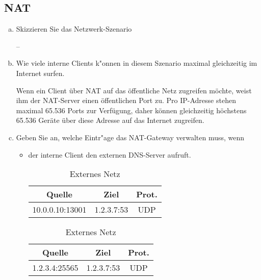 \setcounter{section}{5}
\setcounter{subsection}{14} %
\subsection{NAT}

\begin{enumerate}[(a)]
    \item Skizzieren Sie das Netzwerk-Szenario

        --

    \item Wie viele interne Clients k"onnen in diesem Szenario maximal
        gleichzeitig im Internet surfen.

        Wenn ein Client über NAT auf das öffentliche Netz zugreifen möchte,
        weist ihm der NAT-Server einen öffentlichen Port zu. Pro IP-Adresse
        stehen maximal 65.536 Ports zur Verfügung, daher können gleichzeitig
        höchstens 65.536 Geräte über diese Adresse auf das Internet zugreifen.

    \item Geben Sie an, welche Eintr"age das NAT-Gateway verwalten muss, wenn
        \begin{itemize}
            \item der interne Client den externen DNS-Server aufruft.
                \begin{table}[h]
                    \begin{minipage}{0.49\linewidth}
                        \centering
                        \begin{tabular}{ccc}
                            Quelle          & Ziel       & Prot. \\
                            \hline
                            10.0.0.10:13001 & 1.2.3.7:53 & UDP \\
                        \end{tabular}
                        \caption{Internes Netz}
                    \end{minipage}
                    \begin{minipage}{0.49\linewidth}
                        \centering
                        \begin{tabular}{ccc}
                            Quelle          & Ziel       & Prot. \\
                            \hline
                            1.2.3.4:25565   & 1.2.3.7:53 & UDP \\
                        \end{tabular}
                        \caption{Externes Netz}
                    \end{minipage}
                \end{table}


\end{itemize}
\end{enumerate}
